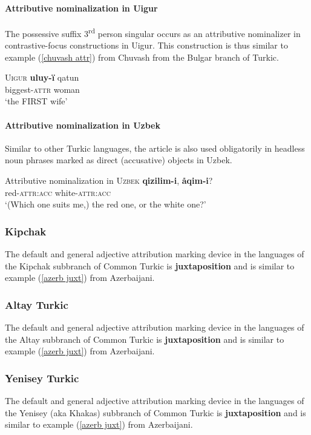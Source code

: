 \paragraph{Attributive nominalization in Uigur} 
The possessive suffix 3\textsuperscript{rd} person singular occurs as an attributive nominalizer in contrastive-focus constructions in Uigur. This construction is thus similar to example (\ref{chuvash attr}) from Chuvash from the Bulgar branch of Turkic.
\begin{exe}
\ex \textsc{Uigur} \citep[17–18, Footnote 58]{benzing1993b}
\gll	\textbf{uluy-ï} qatun\\
	biggest-\textsc{attr} woman\\
\glt	‘the FIRST wife’
\end{exe}

\paragraph{Attributive nominalization in Uzbek}
Similar to other Turkic languages, the article is also used obligatorily in headless noun phrases marked as direct (accusative) objects in Uzbek. 
\begin{exe}
\ex Attributive nominalization in \textsc{Uzbek} \citep[371]{boeschoten1998} \label{uzbek headless acc}	
 \textbf{qizilim-i}, \textbf{åqim-i}?\\
 	{ } red-\textsc{attr:acc} white-\textsc{attr:acc}\\
\glt 	‘(Which one suits me,) the red one, or the white one?’
\end{exe}

\subsubsection{Kipchak}
The default and general adjective attribution marking device in the languages of the Kipchak subbranch of Common Turkic is \textbf{juxtaposition} and is  similar to example (\ref{azerb juxt}) from Azerbaijani.

\subsubsection{Altay Turkic}
The default and general adjective attribution marking device in the languages of the Altay subbranch of Common Turkic is \textbf{juxtaposition}  and is similar to example (\ref{azerb juxt}) from Azerbaijani.

\subsubsection{Yenisey Turkic}
The default and general adjective attribution marking device in the languages of the Yenisey (aka Khakas) subbranch of Common Turkic is \textbf{juxtaposition}  and is similar to example (\ref{azerb juxt}) from Azerbaijani.

